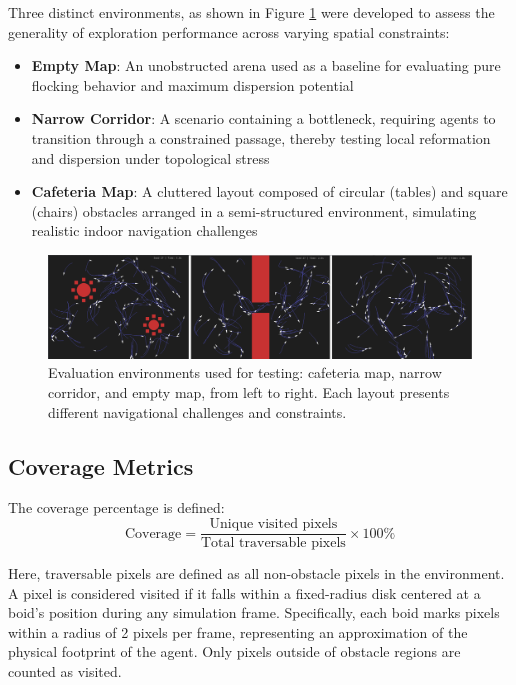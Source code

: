 \documentclass[12pt]{article}
\begin{document}
Three distinct environments, as shown in Figure \ref{fig:boids_maps} were developed to assess the generality of exploration performance across varying spatial constraints:
\begin{itemize}[nosep]
    \item \textbf{Empty Map}: An unobstructed arena used as a baseline for evaluating pure flocking behavior and maximum dispersion potential
    \item \textbf{Narrow Corridor}: A scenario containing a bottleneck, requiring agents to transition through a constrained passage, thereby testing local reformation and dispersion under topological stress
    \item \textbf{Cafeteria Map}: A cluttered layout composed of circular (tables) and square (chairs) obstacles arranged in a semi-structured environment, simulating realistic indoor navigation challenges
\end{itemize}

\begin{figure}[h!]
    \centering
    \includegraphics[width=\linewidth]{boids_maps.png}
    \caption{Evaluation environments used for testing: cafeteria map, narrow corridor, and empty map, from left to right. Each layout presents different navigational challenges and constraints.}
    \label{fig:boids_maps}
  \end{figure}

\subsection{Coverage Metrics}

The coverage percentage is defined:
\[\text{Coverage} = \frac{\text{Unique visited pixels}}{\text{Total traversable pixels}} \times 100\%\]

Here, traversable pixels are defined as all non-obstacle pixels in the environment. A pixel is considered visited if it falls within a fixed-radius disk centered at a boid's position during any simulation frame. Specifically, each boid marks pixels within a radius of 2 pixels per frame, representing an approximation of the physical footprint of the agent. Only pixels outside of obstacle regions are counted as visited.
\end{document}
